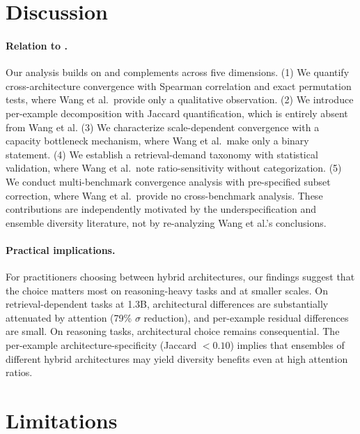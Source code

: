 \documentclass[11pt]{article}
\begin{document}
\section{Discussion}

\paragraph{Relation to \citet{wang2025zoo}.}
Our analysis builds on and complements \citet{wang2025zoo} across five dimensions.
(1) We quantify cross-architecture convergence with Spearman correlation and exact permutation tests, where Wang et al.\ provide only a qualitative observation.
(2) We introduce per-example decomposition with Jaccard quantification, which is entirely absent from Wang et al.
(3) We characterize scale-dependent convergence with a capacity bottleneck mechanism, where Wang et al.\ make only a binary statement.
(4) We establish a retrieval-demand taxonomy with statistical validation, where Wang et al.\ note ratio-sensitivity without categorization.
(5) We conduct multi-benchmark convergence analysis with pre-specified subset correction, where Wang et al.\ provide no cross-benchmark analysis.
These contributions are independently motivated by the underspecification and ensemble diversity literature, not by re-analyzing Wang et al.'s conclusions.

\paragraph{Practical implications.}
For practitioners choosing between hybrid architectures, our findings suggest that the choice matters most on reasoning-heavy tasks and at smaller scales.
On retrieval-dependent tasks at 1.3B, architectural differences are substantially attenuated by attention (79\% $\sigma$ reduction), and per-example residual differences are small.
On reasoning tasks, architectural choice remains consequential.
The per-example architecture-specificity (Jaccard $< 0.10$) implies that ensembles of different hybrid architectures may yield diversity benefits even at high attention ratios.

\section*{Limitations}
\end{document}
